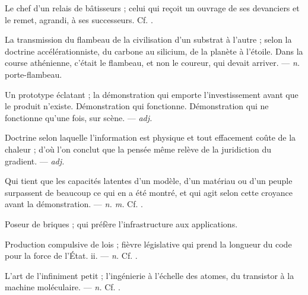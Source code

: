  Le chef d'un relais de bâtisseurs ; celui qui reçoit un ouvrage de ses devanciers et le remet, agrandi, à ses successeurs. Cf. .

 La transmission du flambeau de la civilisation d'un substrat à l'autre ; selon la doctrine accélérationniste, du carbone au silicium, de la planète à l'étoile. Dans la course athénienne, c'était le flambeau, et non le coureur, qui devait arriver. ---  \textit{n.} porte-flambeau.

 Un prototype éclatant ; la démonstration qui emporte l'investissement avant que le produit n'existe.  Démonstration qui fonctionne.   Démonstration qui ne fonctionne qu'une fois, sur scène. ---  \textit{adj.}

 Doctrine selon laquelle l'information est physique et tout effacement coûte de la chaleur ; d'où l'on conclut que la pensée même relève de la juridiction du gradient. ---  \textit{adj.}

 Qui tient que les capacités latentes d'un modèle, d'un matériau ou d'un peuple surpassent de beaucoup ce qui en a été montré, et qui agit selon cette croyance avant la démonstration. ---  \textit{n. m.} Cf. .

 Poseur de briques ; qui préfère l'infrastructure aux applications. 

 Production compulsive de lois ; fièvre législative qui prend la longueur du code pour la force de l'État.   ii. ---  \textit{n.} Cf. .

 L'art de l'infiniment petit ; l'ingénierie à l'échelle des atomes, du transistor à la machine moléculaire. ---  \textit{n.} Cf. .


